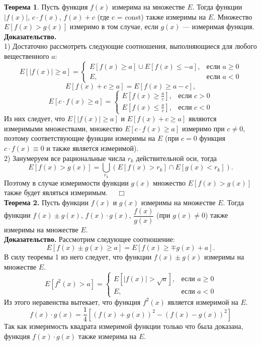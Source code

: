 \documentclass[12pt,a4paper, titlepage]{article}
\begin{document}
\textbf{Теорема 1}. Пусть функция $f(x)$ измерима на множестве $E$. Тогда функции $|f(x)|$, $c \cdot f(x)$, $f(x) + c$ (где c = const) также измеримы на $E$. Множество $E[f(x) > g(x)]$ измеримо в том случае, если $g(x)$ --- измеримая функция.\\
\textbf{Доказательство.}\\
1) Достаточно рассмотреть следующие соотношения, выполняющиеся для любого вещественного $a$:
$$
E[|f(x)| \geqslant a]=\begin{cases}
E[f(x) \geqslant a] \cup E[f(x) \leqslant -a],&\text{если $a \geqslant 0$}\\
E,&\text{если $a < 0$}
\end{cases}
$$
$$
E[f(x) + c \geqslant a] = E[f(x) \geqslant a - c],
$$
$$
E[c \cdot f(x) \geqslant a]=\begin{cases}
E[f(x) \geqslant \frac a c],&\text{если $c > 0$}\\
E[f(x) \leqslant \frac a c],&\text{если $c < 0$}
\end{cases}
$$
Из них следует, что $E[|f(x)| \geqslant a]$ и $E[f(x) + c \geqslant a]$ являются измеримыми множествами, множество $E[c \cdot f(x) \geqslant a]$ измеримо при $c \neq 0$, поэтому соответствующие функции измеримы на $E$ (при $c = 0$ функция $c \cdot f(x) \equiv 0$ и также является измеримой).\\

2) Занумеруем все рациональные числа $r_k$ действительной оси, тогда
$$
E[f(x) > g(x)] = \bigcup_{r_k} (E [f(x)> r_k] \cap E[g(x) < r_k]).
$$
Поэтому в случае измеримости функции $g(x)$ множество $E[f(x) > g(x)]$ также будет являться измеримым. $\quad \Box$\\

\textbf{Теорема 2.} Пусть функции $f(x)$ и $g(x)$ измеримы на множестве $E$. Тогда функции $f(x) \pm g(x)$, $f(x)\cdot g(x)$, $\dfrac{f(x)}{g(x)}$ (при $g(x) \neq 0$) также измеримы на множестве $E$.\\
\textbf{Доказательство.} Рассмотрим следующее соотношение:
$$
E[f(x) \pm g(x) \geqslant a] = E[f(x) \geqslant \mp g(x) + a].
$$
В силу теоремы 1 из него следует, что функции $f(x) \pm g(x)$ измеримы на множестве $E$.
$$
E[f^2(x) > a]=\begin{cases}
E[|f(x)| > \sqrt{a}],&\text{если $a \geqslant 0$}\\
E,&\text{если $a < 0$}
\end{cases}
$$
Из этого неравенства вытекает, что функция $f^2(x)$ является измеримой на $E$.
$$
f(x) \cdot g(x) = \frac 1 4 [(f(x) + g(x))^2 - (f(x) - g(x))^2]
$$
Так как измеримость квадрата измеримой функции только что была доказана, функция $f(x) \cdot g(x)$ также измерима на $E$.
\end{document}
